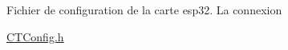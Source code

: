 Fichier de configuration de la carte esp32. La connexion

\mbox{\hyperlink{_c_t_config_8h}{CTConfig.\+h}} ~\newline
 